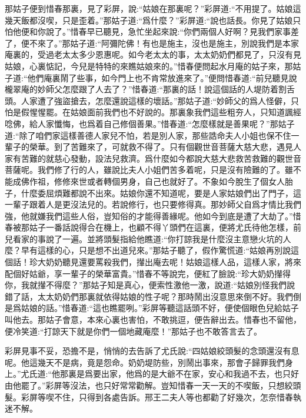 \begin{parag}
    那姑子便到惜春那裏，見了彩屏，說:“姑娘在那裏呢？”彩屏道:“不用提了。姑娘這幾天飯都沒喫，只是歪着。”那姑子道:“爲什麼？”彩屏道:“說也話長。你見了姑娘只怕他便和你說了。”惜春早已聽見，急忙坐起來說:“你們兩個人好啊？見我們家事差了，便不來了。”那姑子道:“阿彌陀佛！有也是施主，沒也是施主，別說我們是本家庵裏的，受過老太太多少恩惠呢。如今老太太的事，太太奶奶們都見了，只沒有見姑娘，心裏惦記，今兒是特特的來瞧姑娘來的。”惜春便問起水月庵的姑子來，那姑子道:“他們庵裏鬧了些事，如今門上也不肯常放進來了。”便問惜春道:“前兒聽見說櫳翠庵的妙師父怎麼跟了人去了？”惜春道:“那裏的話！說這個話的人堤防着割舌頭。人家遭了強盜搶去，怎麼還說這樣的壞話。”那姑子道:“妙師父的爲人怪僻，只怕是假惺惺罷。在姑娘面前我們也不好說的。那裏象我們這些粗夯人，只知道諷經唸佛，給人家懺悔，也爲着自己修個善果。”惜春道:“怎麼樣就是善果呢？”那姑子道:“除了咱們家這樣善德人家兒不怕，若是別人家，那些誥命夫人小姐也保不住一輩子的榮華。到了苦難來了，可就救不得了。只有個觀世音菩薩大慈大悲，遇見人家有苦難的就慈心發動，設法兒救濟。爲什麼如今都說大慈大悲救苦救難的觀世音菩薩呢。我們修了行的人，雖說比夫人小姐們苦多着呢，只是沒有險難的了。雖不能成佛作祖，修修來世或者轉個男身，自己也就好了。不象如今脫生了個女人胎子，什麼委屈煩難都說不出來。姑娘你還不知道呢，要是人家姑娘們出了門子，這一輩子跟着人是更沒法兒的。若說修行，也只要修得真。那妙師父自爲才情比我們強，他就嫌我們這些人俗，豈知俗的才能得善緣呢。他如今到底是遭了大劫了。”惜春被那姑子一番話說得合在機上，也顧不得丫頭們在這裏，便將尤氏待他怎樣，前兒看家的事說了一遍。並將頭髮指給他瞧道:“你打諒我是什麼沒主意戀火坑的人麼？早有這樣的心，只是想不出道兒來。”那姑子聽了，假作驚慌道:“姑娘再別說這個話！珍大奶奶聽見還要罵殺我們，攆出庵去呢！姑娘這樣人品，這樣人家，將來配個好姑爺，享一輩子的榮華富貴。”惜春不等說完，便紅了臉說:“珍大奶奶攆得你，我就攆不得麼？”那姑子知是真心，便索性激他一激，說道:“姑娘別怪我們說錯了話，太太奶奶們那裏就依得姑娘的性子呢？那時鬧出沒意思來倒不好。我們倒是爲姑娘的話。”惜春道:“這也瞧罷咧。”彩屏等聽這話頭不好，便使個眼色兒給姑子叫他去。那姑子會意，本來心裏也害怕，不敢挑逗，便告辭出去。惜春也不留他，便冷笑道:“打諒天下就是你們一個地藏庵麼！”那姑子也不敢答言去了。
\end{parag}


\begin{parag}
    彩屏見事不妥，恐擔不是，悄悄的去告訴了尤氏說:“四姑娘絞頭髮的念頭還沒有息呢。他這幾天不是病，竟是怨命。奶奶堤防些，別鬧出事來，那會子歸罪我們身上。”尤氏道:“他那裏是爲要出家，他爲的是大爺不在家，安心和我過不去，也只好由他罷了。”彩屏等沒法，也只好常常勸解。豈知惜春一天一天的不喫飯，只想絞頭髮。彩屏等喫不住，只得到各處告訴。邢王二夫人等也都勸了好幾次，怎奈惜春執迷不解。
\end{parag}


